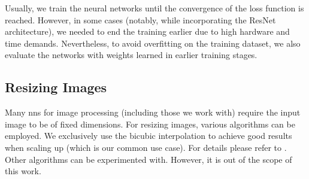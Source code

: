 Usually, we train the neural networks until the convergence of the loss function is reached. However, in some cases (notably, while incorporating the ResNet architecture), we needed to end the training earlier due to high hardware and time demands. Nevertheless, to avoid overfitting on the training dataset, we also evaluate the networks with weights learned in earlier training stages.

\subsection{Resizing Images}

\label{ssec:resizing}

Many \glspl{nn} for image processing (including those we work with) require the input image to be of fixed dimensions. For resizing images, various algorithms can be employed. We exclusively use the bicubic interpolation to achieve good results when scaling up (which is our common use case). For details please refer to \cite{keys1981cubic}. Other algorithms can be experimented with. However, it is out of the scope of this work.